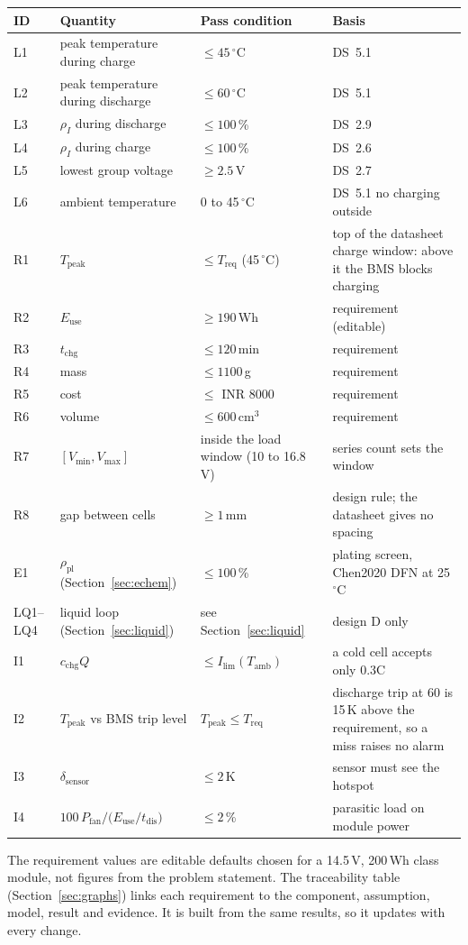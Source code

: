 \documentclass[11pt,a4paper]{article}
\newcommand{\ds}[1]{\textsc{DS}~#1}
\newcommand{\degC}{\ensuremath{{}^{\circ}\mathrm{C}}}
\begin{document}
\begin{longtable}{@{}p{0.9cm}p{5.6cm}p{4.2cm}p{4.2cm}@{}}
\toprule
ID & Quantity & Pass condition & Basis \\
\midrule
\endhead
L1 & peak temperature during charge & $\le 45$\,\degC & \ds{5.1} \\
L2 & peak temperature during discharge & $\le 60$\,\degC & \ds{5.1} \\
L3 & $\rho_I$ during discharge & $\le 100$\,\% & \ds{2.9} \\
L4 & $\rho_I$ during charge & $\le 100$\,\% & \ds{2.6} \\
L5 & lowest group voltage & $\ge 2.5$\,V & \ds{2.7} \\
L6 & ambient temperature & 0 to 45\,\degC & \ds{5.1} no charging outside \\
\midrule
R1 & $T_{\mathrm{peak}}$ & $\le T_{\mathrm{req}}$ (45\,\degC) & top of the datasheet charge window: above it the BMS blocks charging \\
R2 & $E_{\mathrm{use}}$ & $\ge 190$\,Wh & requirement (editable) \\
R3 & $t_{\mathrm{chg}}$ & $\le 120$\,min & requirement \\
R4 & mass & $\le 1100$\,g & requirement \\
R5 & cost & $\le$ INR 8000 & requirement \\
R6 & volume & $\le 600$\,cm$^3$ & requirement \\
R7 & $[V_{\min},V_{\max}]$ & inside the load window (10 to 16.8\,V) & series count sets the window \\
R8 & gap between cells & $\ge 1$\,mm & design rule; the datasheet gives no spacing \\
\midrule
E1 & $\rho_{\mathrm{pl}}$ (Section~\ref{sec:echem}) & $\le 100$\,\% & plating screen, Chen2020 DFN at 25\,\degC \\
\midrule
LQ1--LQ4 & liquid loop (Section~\ref{sec:liquid}) & see Section~\ref{sec:liquid} & design D only \\
\midrule
I1 & $c_{\mathrm{chg}}Q$ & $\le I_{\lim}(T_{\mathrm{amb}})$ & a cold cell accepts only 0.3C \\
I2 & $T_{\mathrm{peak}}$ vs BMS trip level & $T_{\mathrm{peak}}\le T_{\mathrm{req}}$ & discharge trip at 60 is 15\,K above the requirement, so a miss raises no alarm \\
I3 & $\delta_{\mathrm{sensor}}$ & $\le 2$\,K & sensor must see the hotspot \\
I4 & $100\,P_{\mathrm{fan}}\big/\big(E_{\mathrm{use}}/t_{\mathrm{dis}}\big)$ & $\le 2$\,\% & parasitic load on module power \\
\bottomrule
\end{longtable}
The requirement values are editable defaults chosen for a 14.5\,V, 200\,Wh class module, not figures from the problem statement. The traceability table (Section~\ref{sec:graphs}) links each requirement to the component, assumption, model, result and evidence. It is built from the same results, so it updates with every change.
\end{document}
